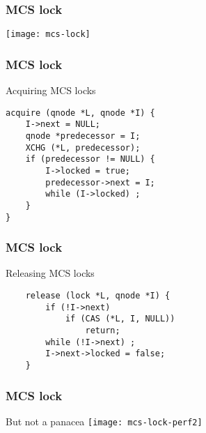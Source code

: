 \begin{frame}[fragile]
    \frametitle{MCS lock}
\centering
\texttt{[image: mcs-lock]}
\end{frame}



\begin{frame}[fragile]
    \frametitle{MCS lock}
    \Large
     Acquiring MCS locks
       
        \begin{block}{}
            \begin{verbatim}
acquire (qnode *L, qnode *I) {
    I->next = NULL;
    qnode *predecessor = I;
    XCHG (*L, predecessor);
    if (predecessor != NULL) {
        I->locked = true;
        predecessor->next = I;
        while (I->locked) ;
    }
}
\end{verbatim}
        \end{block}         

\end{frame}


\begin{frame}[fragile]
    \frametitle{MCS lock}
    \Large
    Releasing MCS locks
    
    \begin{block}{}
        \begin{verbatim}
    release (lock *L, qnode *I) {
        if (!I->next)
            if (CAS (*L, I, NULL))
                return;
        while (!I->next) ;
        I->next->locked = false;
    }
\end{verbatim}
    \end{block}         
    
\end{frame}



\begin{frame}[fragile]
    \frametitle{MCS lock}
    \centering
    But not a  panacea
    \texttt{[image: mcs-lock-perf2]}
\end{frame}


